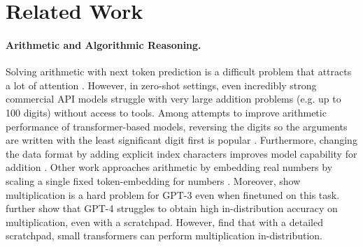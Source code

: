 \documentclass{article}
\begin{document}
\section{Related Work}

\paragraph{Arithmetic and Algorithmic Reasoning.}
Solving arithmetic with next token prediction is a difficult problem that attracts a lot of attention \citep[e.g.][]{saxton2019analysing}. 
However, in zero-shot settings, even incredibly strong commercial API models struggle with very large addition problems (e.g. up to 100 digits) without access to tools. 
Among attempts to improve arithmetic performance of transformer-based models, reversing the digits so the arguments are written with the least significant digit first is popular \citep{lee2023teaching, shen2023positional, zhou2023algorithms, zhou2024transformers}.
Furthermore, changing the data format by adding explicit index characters improves model capability for addition \citep{zhou2023algorithms, zhou2024transformers, olsson2022context}. 
Other work approaches arithmetic by embedding real numbers by scaling a single fixed token-embedding for numbers \citep{golkar2023xval}.
Moreover, \citet{dziri2023faith} show multiplication is a hard problem for GPT-3 \citep{brown2020language} even when finetuned on this task.
\citet{dziri2023faith} further show that GPT-4 \citep{openai2023gpt4tr} struggles to obtain high in-distribution accuracy on multiplication, even with a scratchpad. 
However, \citet{lee2023teaching} find that with a detailed scratchpad, small transformers can perform multiplication in-distribution. 
\end{document}
